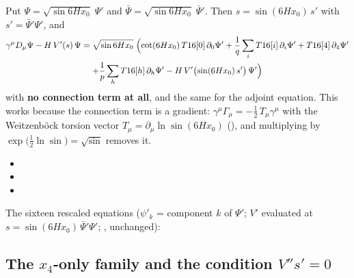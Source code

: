 Put $\Psi=\sqrt{\sin 6Hx_0}\;\Psi'$ and $\bar\Psi=\sqrt{\sin 6Hx_0}\;\bar\Psi'$. Then
$s=\sin(6Hx_0)\,s'$ with $s'=\bar\Psi'\Psi'$, and
\begin{multline*}
  \gamma^\mu D_\mu\Psi-H\,V'(s)\,\Psi=\sqrt{\sin 6Hx_0}\;\Bigl(\cot(6Hx_0)\,T16[0]\,\partial_0\Psi'
  +\frac1q\sum_iT16[i]\,\partial_i\Psi'+T16[4]\,\partial_4\Psi'\\
  +\frac1p\sum_hT16[h]\,\partial_h\Psi'-H\,V'\bigl(\sin(6Hx_0)\,s'\bigr)\,\Psi'\Bigr)
\end{multline*}
with \textbf{no connection term at all}, and the same for the adjoint equation. This works because
the connection term is a gradient: $\gamma^\mu\Gamma_\mu=-\tfrac12\,T_\mu\gamma^\mu$ with the
Weitzenb\"ock torsion vector $T_\mu=\partial_\mu\ln\sin(6Hx_0)$ (), and multiplying by
$\exp\bigl(\tfrac12\ln\sin\bigr)=\sqrt{\sin}$ removes it. 
\begin{itemize}
  \item {}
  \item {}
  \item {}
\end{itemize}

The sixteen rescaled equations ($\psi'_k$ = component $k$ of $\Psi'$; $V'$ evaluated at
$s=\sin(6Hx_0)\,\bar\Psi'\Psi'$;
, unchanged):

{\small

}

\subsection{The \texorpdfstring{$x_4$}{x4}-only family and the condition \texorpdfstring{$V''s'=0$}{V'' s' = 0}}
\label{sec:5.8}

